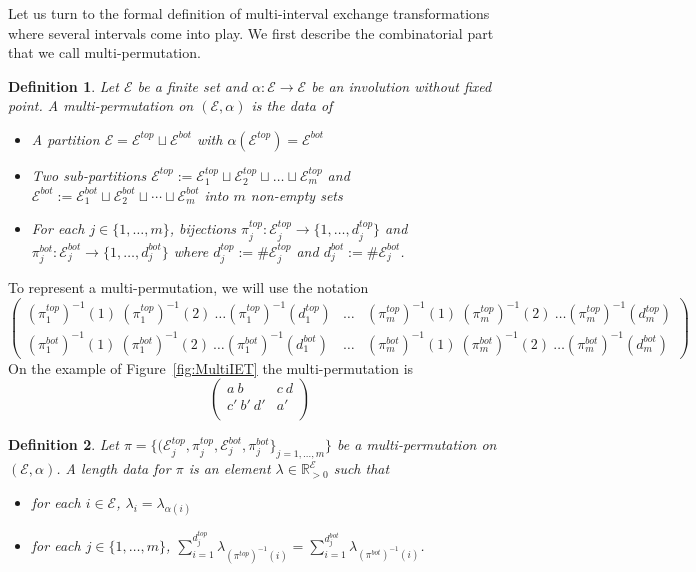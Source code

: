 \documentclass{article}
\def\RR{\mathbb{R}}
\def\cE{\mathcal{E}}
\newtheorem{definition}{Definition}
\begin{document}
Let us turn to the formal definition of multi-interval exchange transformations
where several intervals come into play. We first describe the combinatorial part
that we call multi-permutation.
\begin{definition}
Let $\cE$ be a finite set and $\alpha: \cE \to \cE$ be an involution without fixed point.
A \emph{multi-permutation} on $(\cE, \alpha)$ is the data of
\begin{itemize}
\item A partition $\cE = \cE^{top} \sqcup \cE^{bot}$ with $\alpha(\cE^{top}) = \cE^{bot}$
\item Two sub-partitions $\cE^{top} := \cE^{top}_1 \sqcup \cE^{top}_2 \sqcup \ldots \sqcup \cE^{top}_m$
and $\cE^{bot} := \cE^{bot}_1 \sqcup \cE^{bot}_2 \sqcup \cdots \sqcup \cE^{bot}_m$ into
$m$ non-empty sets
\item For each $j \in \{1, \ldots, m\}$, bijections $\pi^{top}_j: \cE^{top}_j \to \{1, \ldots, d_j^{top}\}$
and $\pi^{bot}_j: \cE^{bot}_j \to \{1, \ldots, d_j^{bot}\}$ where
$d_j^{top} := \# \cE^{top}_j$ and $d_j^{bot} := \# \cE^{bot}_j$.
\end{itemize}
\end{definition}

To represent a multi-permutation, we will use the notation
\[
\left(\begin{array}{c|c|c}
(\pi_1^{top})^{-1}(1)\ (\pi_1^{top})^{-1}(2)\ \ldots (\pi_1^{top})^{-1}(d_1^{top}) &
\ldots &
(\pi_m^{top})^{-1}(1)\ (\pi_m^{top})^{-1}(2)\ \ldots (\pi_m^{top})^{-1}(d_m^{top})
\\
(\pi_1^{bot})^{-1}(1)\ (\pi_1^{bot})^{-1}(2)\ \ldots (\pi_1^{bot})^{-1}(d_1^{bot}) &
\ldots &
(\pi_m^{bot})^{-1}(1)\ (\pi_m^{bot})^{-1}(2)\ \ldots (\pi_m^{bot})^{-1}(d_m^{bot})
\end{array}\right)
\]
On the example of Figure~\ref{fig:MultiIET} the multi-permutation is
\[
\left(\begin{array}{c|c}
a\ b & c\ d \\
c'\ b'\ d' & a' \\
\end{array} \right)
\]

\begin{definition}
Let $\pi = \{(\cE^{top}_j, \pi^{top}_j, \cE^{bot}_j, \pi^{bot}_j\}_{j=1,\ldots,m}\}$ be
a multi-permutation on $(\cE, \alpha)$. A \emph{length data} for $\pi$ is
an element $\lambda \in \RR_{> 0}^{\cE}$ such that
\begin{itemize}
\item for each $i \in \cE$, $\lambda_i = \lambda_{\alpha(i)}$
\item for each $j \in \{1,\ldots,m\}$, $\displaystyle \sum_{i = 1}^{d_j^{top}} \lambda_{(\pi^{top})^{-1}(i)} = \sum_{i = 1}^{d_j^{bot}} \lambda_{(\pi^{bot})^{-1}(i)}$.
\end{itemize}
\end{definition}
\end{document}
